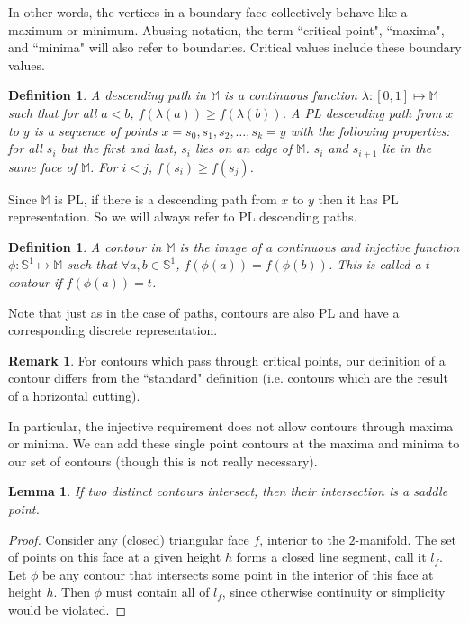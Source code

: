 \documentclass[11pt]{article}
\newtheorem{lemma}[theorem]{Lemma}
\newtheorem{definition}[theorem]{Definition}
\theoremstyle{definition}
\newtheorem{remark}{Remark}
\newcommand{\MM}{\mathbb{M}}
\newcommand{\SSS}{\mathbb{S}}
\begin{document}
{In other words, the vertices in a boundary face collectively behave like a maximum or minimum. 
Abusing notation, the term ``critical point", ``maxima", and ``minima" will also refer to boundaries.
Critical values include these boundary values.

\begin{definition} \label{def:desc} A \emph{descending path} in $\MM$ is a continuous function $\lambda:[0,1] \mapsto \MM$
such that for all $a < b$, $f(\lambda(a)) \geq f(\lambda(b))$. A \emph{PL descending path} from $x$ to $y$ is a sequence
of points $x = s_0, s_1, s_2, \ldots, s_k = y$ with the following properties: for all $s_i$ but the first and last,
$s_i$ lies on an edge of $\MM$. $s_i$ and $s_{i+1}$ lie in the same face of $\MM$. 
For $i < j$, $f(s_i) \geq f(s_j)$.
\end{definition}

Since $\MM$ is PL, if there is a descending path from $x$ to $y$ then it has PL representation. So we will always refer to
PL descending paths.

\begin{definition} \label{def:cont} A \emph{contour} in $\MM$ is the image of a continuous and injective function $\phi:\SSS^1 \mapsto \MM$ such that $\forall a, b \in \SSS^1$, $f(\phi(a)) = f(\phi(b))$. This is called a \emph{$t$-contour} if $f(\phi(a)) = t$.
\end{definition}

Note that just as in the case of paths, contours are also PL and have a corresponding discrete representation.

\begin{remark}
For contours which pass through critical points, our definition of a contour differs from the ``standard" definition (i.e. contours which are the result of a horizontal cutting).  

In particular, the injective requirement does not allow contours through maxima or minima.  We can add these single point contours at the maxima and minima to our set of contours (though this is not really necessary).
\end{remark}

\begin{lemma} \label{lem:cont} If two distinct contours intersect, then their intersection is a saddle point.
\end{lemma} 

\begin{proof}
Consider any (closed) triangular face $f$, interior to the $2$-manifold.  The set of points on this face at a given height $h$ forms a closed line segment, call it $l_f$.  Let $\phi$ be any contour that intersects some point in the interior of this face at height $h$.  Then $\phi$ must contain all of $l_f$, since otherwise continuity or simplicity would be violated.  


\end{proof}}
\end{document}
